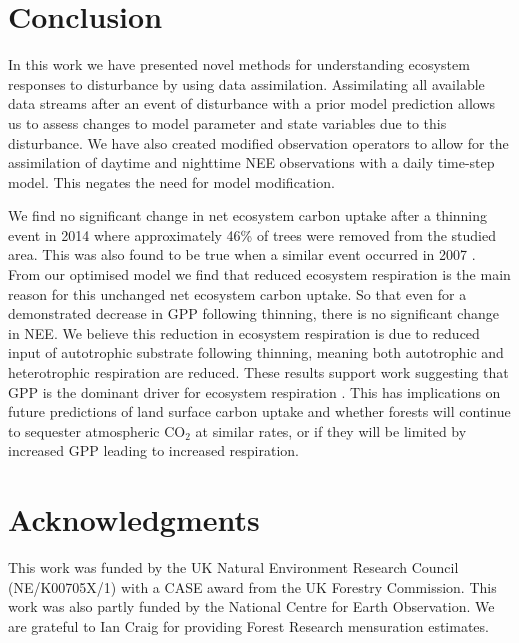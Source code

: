 \documentclass[12pt]{article}
\begin{document}

\section{Conclusion}

In this work we have presented novel methods for understanding ecosystem responses to disturbance by using data assimilation. Assimilating all available data streams after an event of disturbance with a prior model prediction allows us to assess changes to model parameter and state variables due to this disturbance. We have also created modified observation operators to allow for the assimilation of daytime and nighttime NEE observations with a daily time-step model. This negates the need for model modification.

We find no significant change in net ecosystem carbon uptake after a thinning event in 2014 where approximately 46\% of trees were removed from the studied area. This was also found to be true when a similar event occurred in 2007 \citep{wilkinson2015effects}. From our optimised model we find that reduced ecosystem respiration is the main reason for this unchanged net ecosystem carbon uptake. So that even for a demonstrated decrease in GPP following thinning, there is no significant change in NEE. We believe this reduction in ecosystem respiration is due to reduced input of autotrophic substrate following thinning, meaning both autotrophic and heterotrophic respiration are reduced. These results support work suggesting that GPP is the dominant driver for ecosystem respiration  \citep{GCB:GCB412, heinemeyer2012exploring, PCE:PCE1053, hogberg2006towards, ELE:ELE12097}. This has implications on future predictions of land surface carbon uptake and whether forests will continue to sequester atmospheric CO\(_{2}\) at similar rates, or if they will be limited by increased GPP leading to increased respiration. 

\section*{Acknowledgments}
This work was funded by the UK Natural Environment Research Council (NE/K00705X/1) with a CASE award from the UK Forestry Commission. This work was also partly funded by the National Centre for Earth Observation. We are grateful to Ian Craig for providing Forest Research mensuration estimates.
\end{document}
